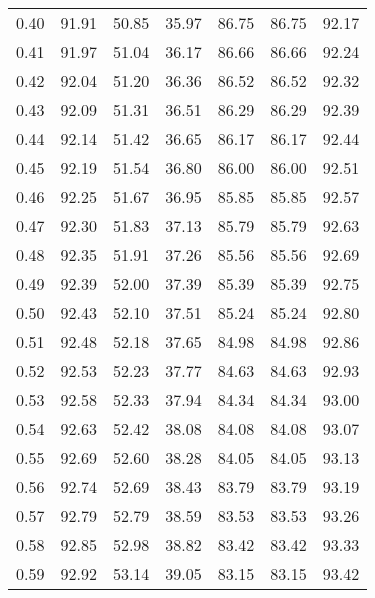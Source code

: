 \begin{tabular}{|c|c|c|c|c|c|c|}
      0.40 &     91.91 &     50.85 &      35.97 &   86.75 &      86.75 &         92.17 \\
      0.41 &     91.97 &     51.04 &      36.17 &   86.66 &      86.66 &         92.24 \\
      0.42 &     92.04 &     51.20 &      36.36 &   86.52 &      86.52 &         92.32 \\
      0.43 &     92.09 &     51.31 &      36.51 &   86.29 &      86.29 &         92.39 \\
      0.44 &     92.14 &     51.42 &      36.65 &   86.17 &      86.17 &         92.44 \\
      0.45 &     92.19 &     51.54 &      36.80 &   86.00 &      86.00 &         92.51 \\
      0.46 &     92.25 &     51.67 &      36.95 &   85.85 &      85.85 &         92.57 \\
      0.47 &     92.30 &     51.83 &      37.13 &   85.79 &      85.79 &         92.63 \\
      0.48 &     92.35 &     51.91 &      37.26 &   85.56 &      85.56 &         92.69 \\
      0.49 &     92.39 &     52.00 &      37.39 &   85.39 &      85.39 &         92.75 \\
      0.50 &     92.43 &     52.10 &      37.51 &   85.24 &      85.24 &         92.80 \\
      0.51 &     92.48 &     52.18 &      37.65 &   84.98 &      84.98 &         92.86 \\
      0.52 &     92.53 &     52.23 &      37.77 &   84.63 &      84.63 &         92.93 \\
      0.53 &     92.58 &     52.33 &      37.94 &   84.34 &      84.34 &         93.00 \\
      0.54 &     92.63 &     52.42 &      38.08 &   84.08 &      84.08 &         93.07 \\
      0.55 &     92.69 &     52.60 &      38.28 &   84.05 &      84.05 &         93.13 \\
      0.56 &     92.74 &     52.69 &      38.43 &   83.79 &      83.79 &         93.19 \\
      0.57 &     92.79 &     52.79 &      38.59 &   83.53 &      83.53 &         93.26 \\
      0.58 &     92.85 &     52.98 &      38.82 &   83.42 &      83.42 &         93.33 \\
      0.59 &     92.92 &     53.14 &      39.05 &   83.15 &      83.15 &         93.42 \\

\end{tabular}
